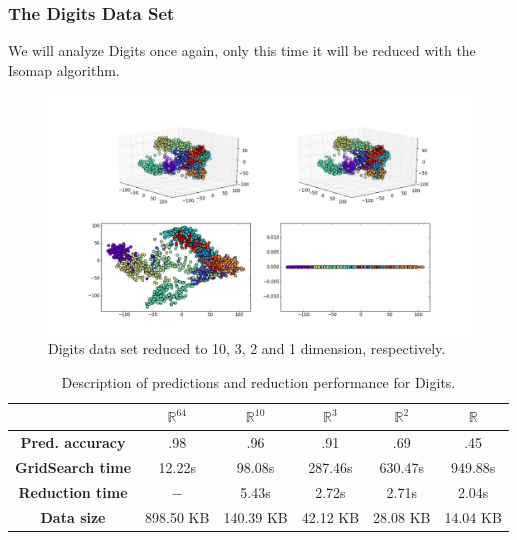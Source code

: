 \documentclass[12pt]{article}
\begin{document}
\subsubsection{The Digits Data Set}

We will analyze Digits once again, only this time it will be reduced with the Isomap algorithm.

\begin{figure}[H]
	\centering
	\includegraphics[width=\linewidth]{dsdigitsiso}
	\captionsetup{justification=centering}
	\caption{Digits data set reduced to 10, 3, 2 and 1 dimension, respectively.}
	\label{fig:dsdigitsiso}
\end{figure}

\begin{table}[H]
	\centering
	\begin{tabular}{|c|c|c|c|c|c|}
		\hline
		& \textbf{$\mathbb{R}^{64}$} & \textbf{$\mathbb{R}^{10}$} & \textbf{$\mathbb{R}^3$} & \textbf{$\mathbb{R}^2$} & \textbf{$\mathbb{R}$} \\\hline
		\textbf{Pred. accuracy}   & .98           & .96           & .91         & .69 & .45  				  \\\hline
		\textbf{GridSearch time} & 12.22s      & 98.08s      & 287.46s   & 630.47s & 949.88s 	\\\hline
		\textbf{Reduction time}  & $-$           & 5.43s        & 2.72s       & 2.71s & 2.04s 			\\\hline
		\textbf{Data size}          & 898.50 KB & 140.39 KB & 42.12 KB  & 28.08 KB & 14.04 KB \\\hline
	\end{tabular}

	\caption{Description of predictions and reduction performance for Digits.}
\end{table}
\end{document}

